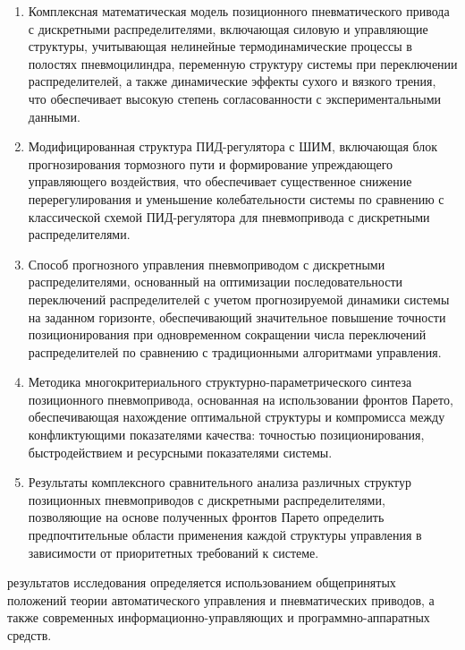 {}
\begin{enumerate}[beginpenalty=10000] %
	\item Комплексная математическая модель позиционного пневматического привода с дискретными
	      распределителями, включающая силовую и управляющие структуры, учитывающая нелинейные
	      термодинамические процессы в полостях пневмоцилиндра, переменную структуру системы при
	      переключении распределителей, а также динамические эффекты сухого и вязкого трения, что
	      обеспечивает высокую степень согласованности с экспериментальными данными.

	\item Модифицированная структура ПИД-регулятора с ШИМ, включающая блок прогнозирования тормозного
	      пути и формирование упреждающего управляющего воздействия, что обеспечивает существенное снижение
	      перерегулирования и уменьшение колебательности системы по сравнению с классической
	      схемой ПИД-регулятора для пневмопривода с дискретными распределителями.


	\item Способ прогнозного управления пневмоприводом с дискретными распределителями, основанный
	      на оптимизации последовательности переключений распределителей с учетом прогнозируемой
	      динамики системы на заданном горизонте, обеспечивающий значительное повышение точности
	      позиционирования при одновременном сокращении числа переключений
	      распределителей по сравнению с традиционными алгоритмами управления.

	\item Методика многокритериального структурно-параметрического синтеза позиционного пневмопривода,
	      основанная на использовании фронтов Парето, обеспечивающая нахождение оптимальной структуры и
	      компромисса между конфликтующими показателями качества: точностью позиционирования,
	      быстродействием и ресурсными показателями системы.

	\item Результаты комплексного сравнительного анализа различных структур позиционных
	      пневмоприводов с дискретными распределителями, позволяющие на основе полученных фронтов
	      Парето определить предпочтительные области применения каждой структуры управления
	      в зависимости от приоритетных требований к системе.
\end{enumerate}

{\reliability}
результатов исследования определяется использованием общепринятых положений теории автоматического управления и
пневматических приводов, а также современных информационно-управляющих и программно-аппаратных средств.

